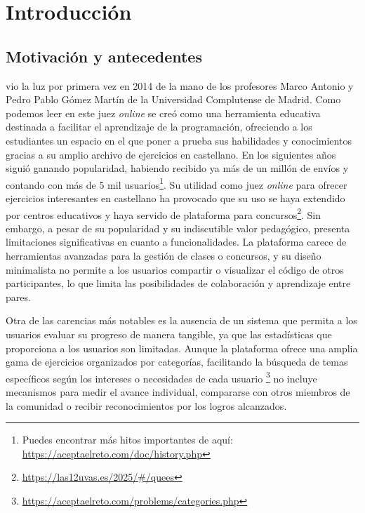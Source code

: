 \chapter{Introducción}
\label{cap:introduccion}

\section{Motivación y antecedentes} 

\aer vio la luz por primera vez en 2014 de la mano de los profesores Marco Antonio y Pedro Pablo Gómez Martín de la Universidad Complutense de Madrid. Como podemos leer en \cite{Pedro_Pablo_Gomez_Martin_Marco_Antonio_Gomez_Martin_2017} este juez \textit{online} se creó como una herramienta educativa destinada a facilitar el aprendizaje de la programación, ofreciendo a los estudiantes un espacio en el que poner a prueba sus habilidades y conocimientos gracias a su amplio archivo de ejercicios en castellano. En los siguientes años siguió ganando popularidad, habiendo recibido ya más de un millón de envíos y contando con más de 5 mil usuarios\footnote{Puedes encontrar más hitos importantes de \aer aquí: \url{https://aceptaelreto.com/doc/history.php}}. Su utilidad como juez \textit{online} para ofrecer ejercicios interesantes en castellano ha provocado que su uso se haya extendido por centros educativos y haya servido de plataforma para concursos\footnote{\url{https://las12uvas.es/2025/\#/quees}}. Sin embargo, a pesar de su popularidad y su indiscutible valor pedagógico, \aer presenta limitaciones significativas en cuanto a funcionalidades. La plataforma carece de herramientas avanzadas para la gestión de clases o concursos, y su diseño minimalista no permite a los usuarios compartir o visualizar el código de otros participantes, lo que limita las posibilidades de colaboración y aprendizaje entre pares.

Otra de las carencias más notables es la ausencia de un sistema que permita a los usuarios evaluar su progreso de manera tangible, ya que las estadísticas que proporciona a los usuarios son limitadas. Aunque la plataforma ofrece una amplia gama de ejercicios organizados por categorías, facilitando la búsqueda de temas específicos según los intereses o necesidades de cada usuario \footnote{\url{https://aceptaelreto.com/problems/categories.php}} no incluye mecanismos para medir el avance individual, compararse con otros miembros de la comunidad o recibir reconocimientos por los logros alcanzados. 


